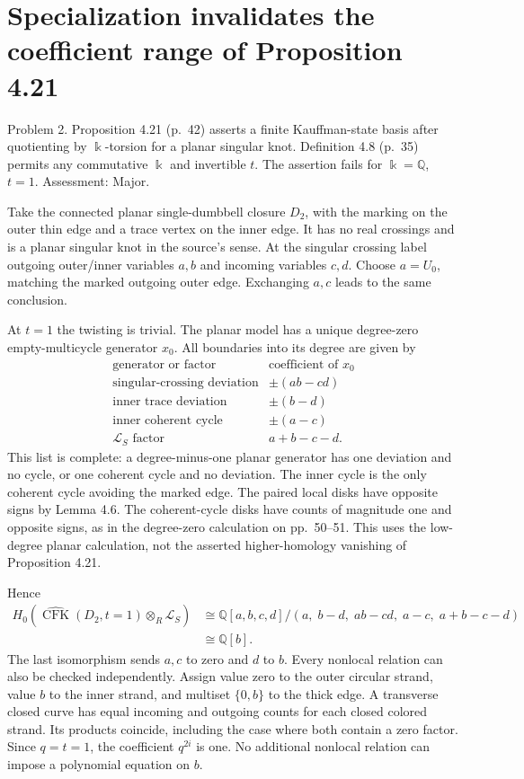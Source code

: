 \documentclass[10pt]{article}
\begin{document}
\section*{Specialization invalidates the coefficient range of Proposition 4.21}
Problem 2.  Proposition 4.21 (p. 42) asserts a finite Kauffman-state basis after quotienting by \(\Bbbk\)-torsion for a planar singular knot. Definition 4.8 (p. 35) permits any commutative \(\Bbbk\) and invertible \(t\). The assertion fails for \(\Bbbk=\mathbb Q\), \(t=1\). Assessment: Major.\par
Take the connected planar single-dumbbell closure \(D_2\), with the marking on the outer thin edge and a trace vertex on the inner edge. It has no real crossings and is a planar singular knot in the source’s sense. At the singular crossing label outgoing outer/inner variables \(a,b\) and incoming variables \(c,d\). Choose \(a=U_0\), matching the marked outgoing outer edge. Exchanging \(a,c\) leads to the same conclusion.\par
At \(t=1\) the twisting is trivial. The planar model has a unique degree-zero empty-multicycle generator \(x_0\). All boundaries into its degree are given by \[\begin{array}{c|c}
\text{generator or factor}&\text{coefficient of }x_0\\ \hline
\text{singular-crossing deviation}&\pm(ab-cd)\\
\text{inner trace deviation}&\pm(b-d)\\
\text{inner coherent cycle}&\pm(a-c)\\
\mathcal L_S\text{ factor}&a+b-c-d .
\end{array}\] This list is complete: a degree-minus-one planar generator has one deviation and no cycle, or one coherent cycle and no deviation. The inner cycle is the only coherent cycle avoiding the marked edge. The paired local disks have opposite signs by Lemma 4.6. The coherent-cycle disks have counts of magnitude one and opposite signs, as in the degree-zero calculation on pp. 50–51. This uses the low-degree planar calculation, not the asserted higher-homology vanishing of Proposition 4.21.\par
Hence \[\begin{aligned}
 H_0(\widehat{\operatorname{CFK}}(D_2,t=1)\otimes_R\mathcal L_S)
 &\cong \mathbb Q[a,b,c,d]/
 (a,\;b-d,\;ab-cd,\;a-c,\;a+b-c-d)\\
 &\cong\mathbb Q[b].\end{aligned}\] The last isomorphism sends \(a,c\) to zero and \(d\) to \(b\). Every nonlocal relation can also be checked independently. Assign value zero to the outer circular strand, value \(b\) to the inner strand, and multiset \(\{0,b\}\) to the thick edge. A transverse closed curve has equal incoming and outgoing counts for each closed colored strand. Its products coincide, including the case where both contain a zero factor. Since \(q=t=1\), the coefficient \(q^{2i}\) is one. No additional nonlocal relation can impose a polynomial equation on \(b\).\par
\end{document}
